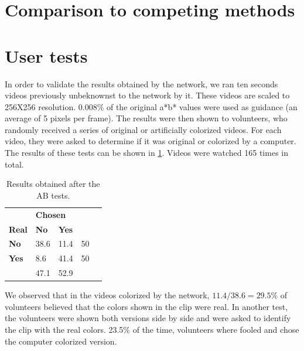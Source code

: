 \documentclass[12pt,openright,oneside,a4paper,english]{abntex2}
\begin{document}
\begin{otherlanguage}{english}
\section{Comparison to competing methods}


\section{User tests}
In order to validate the results obtained by the network, we ran ten seconds videos previously unbeknownst to the network by it. These videos are scaled to 256X256 resolution. 0.008\% of the original a*b* values were used as guidance (an average of 5 pixels per frame). The results were then shown to volunteers, who randomly received a series of original or artificially colorized videos. For each video, they were asked to determine if it was original or colorized by a computer. The results of these tests can be shown in \ref{table:ABresults}. Videos were watched 165 times in total.

\begin{table}[H]
\centering
\begin{tabular}{l|l|l|ll}
\cline{2-3}
                                    & \multicolumn{2}{l|}{\textbf{Chosen}} &                           &  \\ \cline{1-3}
\multicolumn{1}{|l|}{\textbf{Real}} & \textbf{No}      & \textbf{Yes}      &                           &  \\ \cline{1-4}
\multicolumn{1}{|l|}{\textbf{No}}   & 38.6             & 11.4              & \multicolumn{1}{l|}{50} &  \\ \cline{1-4}
\multicolumn{1}{|l|}{\textbf{Yes}}  & 8.6              & 41.4              & \multicolumn{1}{l|}{50} &  \\ \cline{1-4}
                                    & 47.1             & 52.9              &                           &  \\ \cline{2-3}
\end{tabular}
\label{table:ABresults}
\caption{Results obtained after the AB tests.}
\end{table}

We observed that in the videos colorized by the network, \(11.4/38.6 = 29.5\% \) of volunteers  believed that the colors shown in the clip were real. In another test, the volunteers were shown both versions side by side and were asked to identify the clip with the real colors. 23.5\% of the time, volunteers where fooled and chose the computer colorized version.


\end{otherlanguage}
\end{document}
